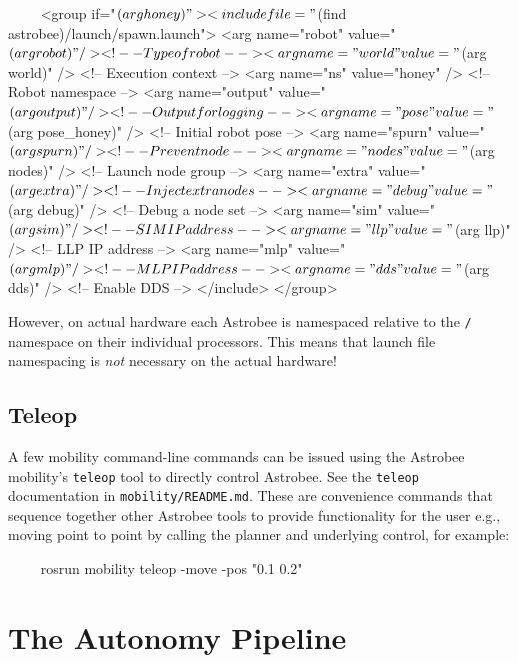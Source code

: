 \documentclass{article}
\begin{document}
\begin{markdown}
~~~~
<group if="$(arg honey)">
<include file="$(find astrobee)/launch/spawn.launch">
  <arg name="robot" value="$(arg robot)" />      <!-- Type of robot      -->
  <arg name="world" value="$(arg world)" />      <!-- Execution context  -->
  <arg name="ns" value="honey" />                <!-- Robot namespace    -->
  <arg name="output" value="$(arg output)" />    <!-- Output for logging -->
  <arg name="pose" value="$(arg pose_honey)" />  <!-- Initial robot pose -->
  <arg name="spurn" value="$(arg spurn)" />      <!-- Prevent node       -->
  <arg name="nodes" value="$(arg nodes)" />      <!-- Launch node group  -->
  <arg name="extra" value="$(arg extra)" />      <!-- Inject extra nodes -->
  <arg name="debug" value="$(arg debug)" />      <!-- Debug a node set   -->
  <arg name="sim" value="$(arg sim)" />          <!-- SIM IP address     -->
  <arg name="llp" value="$(arg llp)" />          <!-- LLP IP address     -->
  <arg name="mlp" value="$(arg mlp)" />          <!-- MLP IP address     -->
  <arg name="dds" value="$(arg dds)" />          <!-- Enable DDS         -->
</include>
</group>
~~~~
\end{markdown}

However, on actual hardware each Astrobee is namespaced relative to the \texttt{/} namespace on their individual processors. This means that launch file namespacing is \textit{not} necessary on the actual hardware!


\subsection{Teleop}

A few mobility command-line commands can be issued using the Astrobee mobility's \texttt{teleop} tool to directly control Astrobee. See the \texttt{teleop} documentation in \texttt{mobility/README.md}. These are convenience commands that sequence together other Astrobee tools to provide functionality for the user e.g., moving point to point by calling the planner and underlying control, for example:

\begin{markdown}
~~~~
rosrun mobility teleop -move -pos "0.1 0.2"
~~~~
\end{markdown}



\clearpage
\section{The Autonomy Pipeline}
\end{document}
